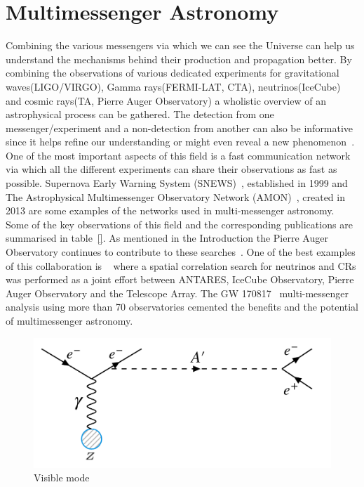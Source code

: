 \section{Multimessenger Astronomy}
  \label{sec:Mul-mes}
Combining the various messengers via which we can see the Universe can help us understand the mechanisms behind their production and propagation better. By combining the observations of various dedicated experiments for gravitational waves(LIGO/VIRGO), Gamma rays(FERMI-LAT, CTA), neutrinos(IceCube) and cosmic rays(TA, Pierre Auger Observatory) a wholistic overview of an astrophysical process can be gathered. The detection from one messenger/experiment and a non-detection from another can also be informative since it helps refine our understanding or might even reveal a new phenomenon~\cite{}. One of the most important aspects of this field is a fast communication network via which all the different experiments can share their observations as fast as possible. Supernova Early Warning System (SNEWS)~\cite{}, established in 1999 and The Astrophysical Multimessenger Observatory Network (AMON)~\cite{}, created in 2013 are some examples of the networks used in multi-messenger astronomy.  Some of the key observations of this field and the corresponding publications are summarised in table~\ref{}. As mentioned in the Introduction the Pierre Auger Observatory continues to contribute to these searches~\cite{}. One of the best examples of this collaboration is ~\cite{} where a spatial correlation search for neutrinos and CRs was performed as a joint effort between ANTARES, IceCube Observatory, Pierre Auger Observatory and the Telescope Array. The GW 170817~\cite{} multi-messenger analysis using more than 70 observatories cemented the benefits and the potential of multimessenger astronomy. 



\begin{figure}[t!]
\centering
\includegraphics[width=14.5cm]{thesis_figures/VISIBLE.png}
\caption{Visible mode }
\label{fig:Visible_feynman}
\end{figure}

